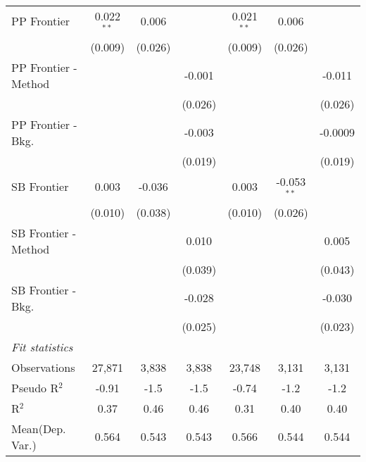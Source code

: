 \begin{tabular}{lcccccc}
   PP Frontier          & 0.022$^{**}$  & 0.006         &                & 0.021$^{**}$   & 0.006         &   \\   
                        & (0.009)       & (0.026)       &                & (0.009)        & (0.026)       &   \\   
   PP Frontier - Method &               &               & -0.001         &                &               & -0.011\\   
                        &               &               & (0.026)        &                &               & (0.026)\\   
   PP Frontier - Bkg.   &               &               & -0.003         &                &               & -0.0009\\   
                        &               &               & (0.019)        &                &               & (0.019)\\   
   SB Frontier          & 0.003         & -0.036        &                & 0.003          & -0.053$^{**}$ &   \\   
                        & (0.010)       & (0.038)       &                & (0.010)        & (0.026)       &   \\   
   SB Frontier - Method &               &               & 0.010          &                &               & 0.005\\   
                        &               &               & (0.039)        &                &               & (0.043)\\   
   SB Frontier - Bkg.   &               &               & -0.028         &                &               & -0.030\\   
                        &               &               & (0.025)        &                &               & (0.023)\\   
   \midrule
   \emph{Fit statistics}\\
   Observations         & 27,871        & 3,838         & 3,838          & 23,748         & 3,131         & 3,131\\  
   Pseudo R$^2$         & -0.91         & -1.5          & -1.5           & -0.74          & -1.2          & -1.2\\  
   R$^2$                & 0.37          & 0.46          & 0.46           & 0.31           & 0.40          & 0.40\\  
Mean(Dep. Var.) & 0.564 & 0.543 & 0.543 & 0.566 & 0.544 & 0.544 \\
   

\end{tabular}
